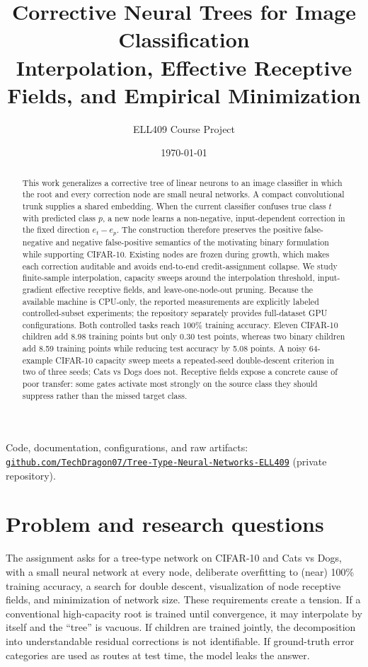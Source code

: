 \documentclass[11pt,a4paper]{article}
\title{\textbf{Corrective Neural Trees for Image Classification}\\
\large Interpolation, Effective Receptive Fields, and Empirical Minimization}
\author{ELL409 Course Project}
\date{\today}
\begin{document}
\maketitle

\begin{center}
\small
Code, documentation, configurations, and raw artifacts:
\href{https://github.com/TechDragon07/Tree-Type-Neural-Networks-ELL409}
{\texttt{github.com/TechDragon07/Tree-Type-Neural-Networks-ELL409}}
(private repository).
\end{center}

\begin{abstract}
This work generalizes a corrective tree of linear neurons to an image
classifier in which the root and every correction node are small neural
networks. A compact convolutional trunk supplies a shared embedding. When the
current classifier confuses true class \(t\) with predicted class \(p\), a new
node learns a non-negative, input-dependent correction in the fixed direction
\(e_t-e_p\). The construction therefore preserves the positive
false-negative and negative false-positive semantics of the motivating binary
formulation while supporting CIFAR-10. Existing nodes are frozen during growth,
which makes each correction auditable and avoids end-to-end credit-assignment
collapse. We study finite-sample interpolation, capacity sweeps around the
interpolation threshold, input-gradient effective receptive fields, and
leave-one-node-out pruning. Because the available machine is CPU-only, the
reported measurements are explicitly labeled controlled-subset experiments;
the repository separately provides full-dataset GPU configurations. Both
controlled tasks reach 100\% training accuracy. Eleven CIFAR-10 children add
8.98 training points but only 0.30 test points, whereas two binary children add
8.59 training points while reducing test accuracy by 5.08 points. A noisy
64-example CIFAR-10 capacity sweep meets a repeated-seed double-descent
criterion in two of three seeds; Cats vs Dogs does not. Receptive fields expose
a concrete cause of poor transfer: some gates activate most strongly on the
source class they should suppress rather than the missed target class.
\end{abstract}

\section{Problem and research questions}

The assignment asks for a tree-type network on CIFAR-10 and Cats vs Dogs,
with a small neural network at every node, deliberate overfitting to (near)
100\% training accuracy, a search for double descent, visualization of node
receptive fields, and minimization of network size. These requirements create
a tension. If a conventional high-capacity root is trained until convergence,
it may interpolate by itself and the ``tree'' is vacuous. If children are
trained jointly, the decomposition into understandable residual corrections
is not identifiable. If ground-truth error categories are used as routes at
test time, the model leaks the answer.
\end{document}

